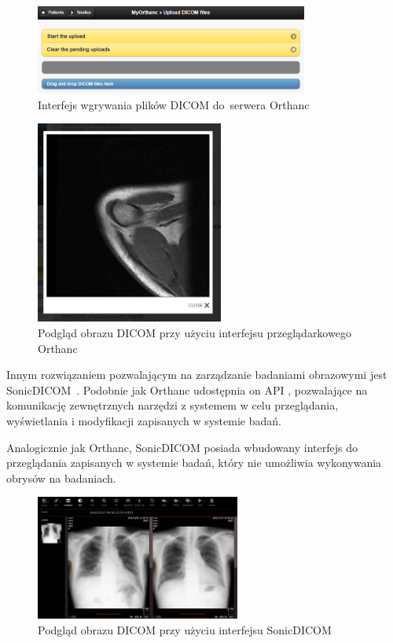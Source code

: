 \documentclass[a4paper,11pt,twoside,openright]{report}
\theoremstyle{definition}
\begin{document}
\begin{figure}[tb!]
	\center
	\includegraphics[width=0.8\textwidth]{Orthanc-upload}
	\caption{Interfejs wgrywania plików DICOM do~serwera Orthanc \cite{Orthanc}}
    	\label{fig:Orthanc-upload}
\end{figure}

\begin{figure}[tbh!]
	\center
	\includegraphics[width=0.55\textwidth]{Orthanc-preview}
	\caption{Podgląd obrazu DICOM przy użyciu interfejsu przeglądarkowego Orthanc}
    	\label{fig:Orthanc-preview}
\end{figure}

Innym rozwiązaniem pozwalającym na zarządzanie badaniami obrazowymi jest SonicDICOM~\cite{SonicDICOM}.
Podobnie jak Orthanc udostępnia on API \cite{SonicDICOM API}, pozwalające na komunikację zewnętrznych narzędzi
z systemem w celu przeglądania, wyświetlania i modyfikacji zapisanych w systemie badań.

Analogicznie jak Orthanc, SonicDICOM posiada wbudowany interfejs do przeglądania
zapisanych w systemie badań, który nie umożliwia wykonywania obrysów na badaniach.

\begin{figure}[tb!]
	\center
	\includegraphics[width=0.6\textwidth]{SoniCDICOMViewer}
	\caption{Podgląd obrazu DICOM przy użyciu interfejsu SonicDICOM \cite{SonicDICOM API}}
    	\label{fig:SonicDICOM}
\end{figure}
\end{document}
